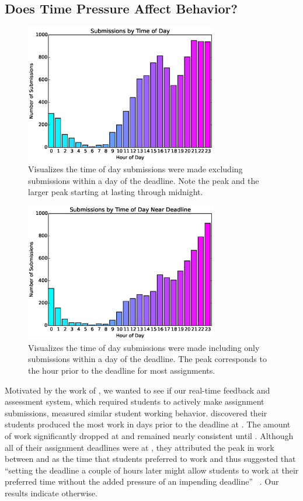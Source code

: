 \subsection{Does Time Pressure Affect Behavior?}

\begin{figure}[!t]
\centering
\includegraphics[width=3.3in]{graphs/Submissions_by_Time_of_Day.eps}
\caption{Visualizes the time of day submissions were made excluding submissions
  within a day of the deadline. Note the  peak and the larger peak
  starting at  lasting through midnight.}
\end{figure}

\begin{figure}[!t]
\centering
\includegraphics[width=3.3in]{graphs/Submissions_by_Time_of_Day_Near_Deadline.eps}
\caption{Visualizes the time of day submissions were made including only
  submissions within a day of the deadline. The  peak corresponds to the
  hour prior to the deadline for most assignments.}
\end{figure}

Motivated by the work of \spacco{}, we wanted to see if our real-time feedback
and assessment system, which required students to actively make assignment
submissions, measured similar student working behavior. \spacco{} discovered
their students produced the most work in days prior to the deadline at
. The amount of work significantly dropped at  and remained nearly
consistent until . Although all of their assignment deadlines were at
, they attributed the peak in work between  and  as the time
that students preferred to work and thus suggested that ``setting the deadline
a couple of hours later might allow students to work at their preferred time
without the added pressure of an impending deadline''
~\cite{Spacco:2013:TIP:2462476.2465594}. Our results indicate otherwise.

